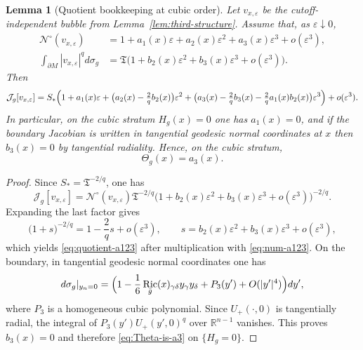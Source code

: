 \documentclass[11pt,reqno,a4paper]{amsart}
\newcommand{\R}{\mathbb{R}}
\DeclareMathOperator{\Ric}{Ric}
\numberwithin{equation}{section}
\theoremstyle{plain}
\newtheorem{lemma}[theorem]{Lemma}
\theoremstyle{remark}
\theoremstyle{plain}
\begin{document}
\begin{lemma}[Quotient bookkeeping at cubic order]\label{lem:Theta-bookkeeping}
Let $v_{x,\varepsilon}$ be the cutoff-independent bubble from Lemma~\ref{lem:third-structure}. Assume that, as $\varepsilon\downarrow0$,
\begin{align}
\mathcal N^\circ(v_{x,\varepsilon})
&=1+a_1(x)\varepsilon+a_2(x)\varepsilon^2+a_3(x)\varepsilon^3+o(\varepsilon^3),\label{eq:num-a123}\\
\int_{\partial M}|v_{x,\varepsilon}|^qd\sigma_g
&=\mathfrak T\bigl(1+b_2(x)\varepsilon^2+b_3(x)\varepsilon^3+o(\varepsilon^3)\bigr).\label{eq:den-b23}
\end{align}
Then
\begin{equation}\label{eq:quotient-a123}
\mathcal J_g[v_{x,\varepsilon}]
=S_*\Bigl(1+a_1(x)\varepsilon+\bigl(a_2(x)-\tfrac{2}{q}b_2(x)\bigr)\varepsilon^2
+\bigl(a_3(x)-\tfrac{2}{q}b_3(x)-\tfrac{2}{q}a_1(x)b_2(x)\bigr)\varepsilon^3\Bigr)+o(\varepsilon^3).
\end{equation}
In particular, on the cubic stratum $H_g(x)=0$ one has $a_1(x)=0$, and if the boundary Jacobian is written in tangential geodesic normal coordinates at $x$ then $b_3(x)=0$ by tangential radiality. Hence, on the cubic stratum,
\begin{equation}\label{eq:Theta-is-a3}
\Theta_g(x)=a_3(x).
\end{equation}
\end{lemma}

\begin{proof}
Since $S_*=\mathfrak T^{-2/q}$, one has
\[
\mathcal J_g[v_{x,\varepsilon}]=\mathcal N^\circ(v_{x,\varepsilon})\mathfrak T^{-2/q}
\bigl(1+b_2(x)\varepsilon^2+b_3(x)\varepsilon^3+o(\varepsilon^3)\bigr)^{-2/q}.
\]
Expanding the last factor gives
\[
\bigl(1+s\bigr)^{-2/q}=1-\frac{2}{q}s+o(\varepsilon^3),
\qquad s=b_2(x)\varepsilon^2+b_3(x)\varepsilon^3+o(\varepsilon^3),
\]
which yields \eqref{eq:quotient-a123} after multiplication with \eqref{eq:num-a123}. On the boundary, in tangential geodesic normal coordinates one has
\[
d\sigma_g|_{y_n=0}=
\Bigl(1-\frac16\Ric_{\bar g}(x)_{\gamma\delta}y_\gamma y_\delta+P_3(y')+O(|y'|^4)\Bigr)dy',
\]
where $P_3$ is a homogeneous cubic polynomial. Since $U_+(\cdot,0)$ is tangentially radial, the integral of $P_3(y')U_+(y',0)^q$ over $\R^{n-1}$ vanishes. This proves $b_3(x)=0$ and therefore \eqref{eq:Theta-is-a3} on $\{H_g=0\}$.
\end{proof}
\end{document}
